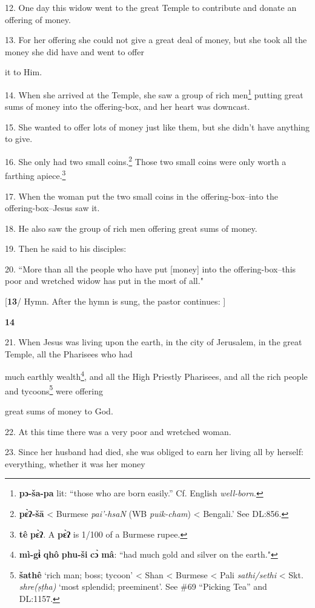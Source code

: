 12. One day this widow went to the great Temple to contribute and donate an offering
of money.

13. For her offering she could not give a great deal of money, but she took all
the money she did have and went to offer

it to Him.

14. When she arrived at the Temple, she saw a group of rich men\footnote{\textbf{pɔ-ša-pa} lit: ``those who are born easily.'' Cf. English \textit{well-born}.} putting great
sums of money into the offering-box, and her heart was downcast.

15. She wanted to offer lots of money just like them, but she didn't have anything
to give.

16. She only had two small coins.\footnote{\textbf{pɛ̀ʔ-šā} < Burmese \textit{pai'-hsaN} (WB \textit{puik-cham}) < Bengali.' See DL:856.} Those two small coins were only worth a farthing
apiece.\footnote{\textbf{tê} \textbf{pɛ̀ʔ}. A \textbf{pɛ̀ʔ} is 1/100 of a Burmese rupee.}

17. When the woman put the two small coins in the offering-box--into the offering-box--Jesus
saw it.

18. He also saw the group of rich men offering great sums of money.

19. Then he said to his disciples:

20. ``More than all the people who have put [money] into the offering-box--this
poor and wretched widow has put in the most of all."

[\textbf{13}/ Hymn. After the hymn is sung, the pastor continues: ]

\textbf{14 }

21. When Jesus was living upon the earth, in the city of Jerusalem, in the great
Temple, all the Pharisees who had

much earthly wealth\footnote{\textbf{mì-gɨ̀} \textbf{qhô} \textbf{phu-ši} \textbf{cɔ̀} \textbf{mâ}: ``had much gold and silver on the earth."}, and all the High Priestly Pharisees, and all the rich
people and tycoons\footnote{\textbf{šathê} `rich man; boss; tycoon' < Shan < Burmese < Pali \textit{sathi/sethi} < Skt. \textit{shre(ṣṭha)} `most splendid; preeminent'. See \#69 ``Picking Tea'' and DL:1157.} were offering

great sums of money to God.

22. At this time there was a very poor and wretched woman.

23. Since her husband had died, she was obliged to earn her living all by herself:
everything, whether it was her money

